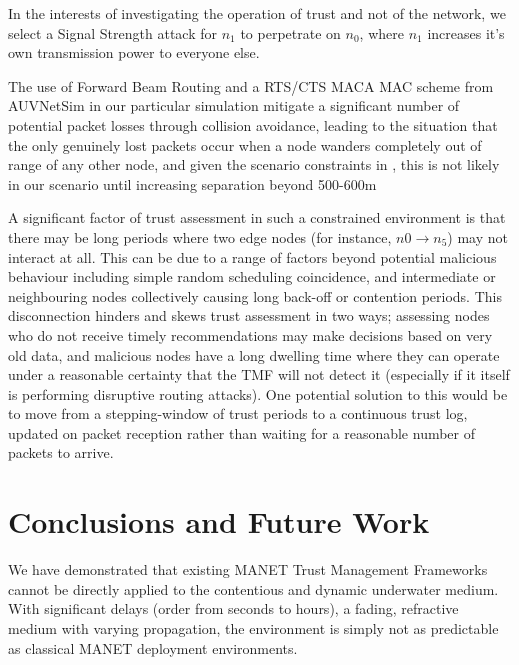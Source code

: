 \documentclass[runningheads,a4paper]{llncs}
\begin{document}
In the interests of investigating the operation of trust and not of the network, we select a Signal Strength attack for $n_1$ to perpetrate on $n_0$, where $n_1$ increases it's own transmission power to everyone else. 

The use of Forward Beam Routing and a RTS/CTS MACA MAC scheme from AUVNetSim in our particular simulation mitigate a significant number of potential packet losses through collision avoidance, leading to the situation that the only genuinely lost packets occur when a node wanders completely out of range of any other node, and given the scenario constraints in \cite{Guo11}, this is not likely in our scenario until increasing separation beyond 500-600m

A significant factor of trust assessment in such a constrained environment is that there may be long periods where two edge nodes (for instance, $n0 \to n_5$) may not interact at all. 
This can be due to a range of factors beyond potential malicious behaviour including simple random scheduling coincidence, and intermediate or neighbouring nodes collectively causing long back-off or contention periods.
This disconnection hinders and skews trust assessment in two ways; assessing nodes who do not receive timely recommendations may make decisions based on very old data, and malicious nodes have a long dwelling time where they can operate under a reasonable certainty that the TMF will not detect it (especially if it itself is performing disruptive routing attacks).
One potential solution to this would be to move from a stepping-window of trust periods to a continuous trust log, updated on packet reception rather than waiting for a reasonable number of packets to arrive.


\section{Conclusions and Future Work}
We have demonstrated that existing MANET Trust Management Frameworks cannot be directly applied to the contentious and dynamic underwater medium.
With significant delays (order from seconds to hours), a fading, refractive medium with varying propagation, the environment is simply not as predictable as classical MANET deployment environments. 
\end{document}
